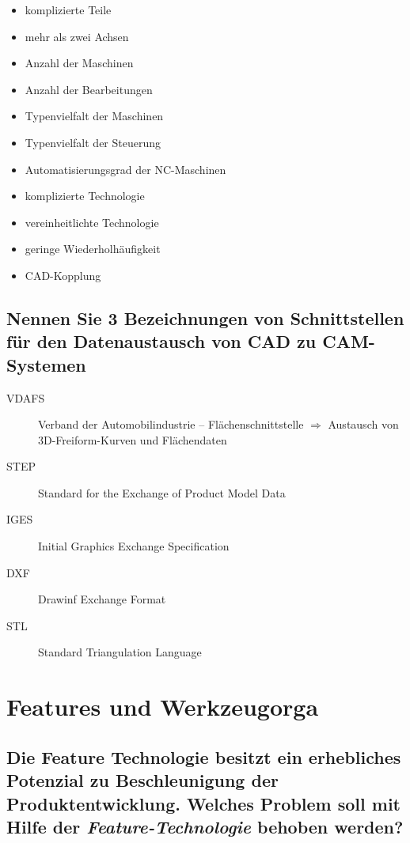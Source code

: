 \begin{itemize}
    \item komplizierte Teile 
    \item mehr als zwei Achsen 
    \item Anzahl der Maschinen 
    \item Anzahl der Bearbeitungen 
    \item Typenvielfalt der Maschinen 
    \item Typenvielfalt der Steuerung 
    \item Automatisierungsgrad der NC-Maschinen 
    \item komplizierte Technologie
    \item vereinheitlichte Technologie 
    \item geringe Wiederholhäufigkeit 
    \item CAD-Kopplung
\end{itemize}

\subsection*{%
    Nennen Sie 3 Bezeichnungen von Schnittstellen für den Datenaustausch von
    CAD zu CAM-Systemen
}

\begin{description}
    \item[VDAFS]
        Verband der Automobilindustrie – Flächenschnittstelle $\Rightarrow$
        Austausch von 3D-Freiform-Kurven und Flächendaten 
    \item[STEP] Standard for the Exchange of Product Model Data 
    \item[IGES] Initial Graphics Exchange Specification 
    \item[DXF] Drawinf Exchange Format 
    \item[STL] Standard Triangulation Language 
\end{description}

\newpage

\section{Features und Werkzeugorga}

\subsection*{%
    Die Feature Technologie besitzt ein erhebliches Potenzial zu Beschleunigung
    der Produktentwicklung. Welches Problem soll mit Hilfe der
    \emph{Feature-Technologie} behoben werden?
}

